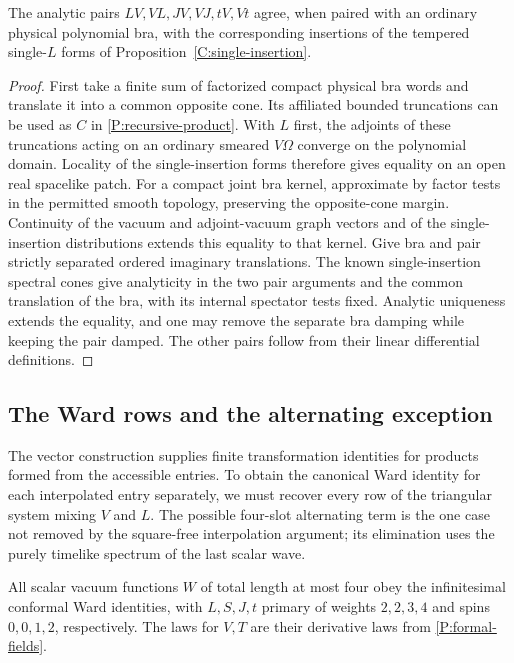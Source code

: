 \begin{lemma}
\label{P:single-comparison}
The analytic pairs $LV,VL,JV,VJ,tV,Vt$ agree, when paired with an
ordinary physical polynomial bra, with the corresponding insertions of the
tempered single-$L$ forms of Proposition~\ref{C:single-insertion}.
\end{lemma}

\begin{proof}
First take a finite sum of factorized compact physical bra words and
translate it into a common opposite cone.  Its affiliated bounded
truncations can be used as $C$ in
\eqref{P:recursive-product}.  With $L$ first, the adjoints of these
truncations acting on an ordinary smeared $V\Omega$ converge on the
polynomial domain.  Locality of the single-insertion forms therefore
gives equality on an open real spacelike patch.  For a compact joint
bra kernel, approximate by factor tests in the permitted smooth
topology, preserving the opposite-cone margin.  Continuity of the
vacuum and adjoint-vacuum graph vectors and of the single-insertion
distributions extends this equality to that kernel.  Give bra and pair
strictly separated ordered imaginary translations.  The known
single-insertion spectral cones give analyticity in the two pair
arguments and the common translation of the bra, with its internal
spectator tests fixed.  Analytic uniqueness extends the equality, and
one may remove the separate bra damping while keeping the pair damped.
The other pairs follow from their linear differential definitions.
\end{proof}

\subsection{The Ward rows and the alternating exception}

The vector construction supplies finite transformation identities
for products formed from the accessible entries.  To obtain the
canonical Ward identity for each interpolated entry separately, we
must recover every row of the triangular system mixing $V$ and $L$.
The possible four-slot alternating term is the one case not removed
by the square-free interpolation argument; its elimination uses the
purely timelike spectrum of the last scalar wave.

\begin{proposition}
\label{P:short-covariance}
All scalar vacuum functions $W$ of total length at most four obey the
infinitesimal conformal Ward identities, with $L,S,J,t$ primary of
weights $2,2,3,4$ and spins $0,0,1,2$, respectively.  The laws for $V,T$
are their derivative laws from \eqref{P:formal-fields}.
\end{proposition}

